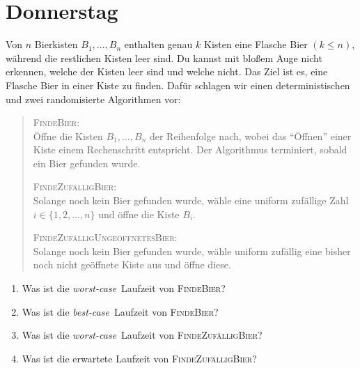 \documentclass{uebung_cs}
\begin{document}
\section*{Donnerstag}

\begin{exercise}[Bierkisten][\href{https://moodle.studiumdigitale.uni-frankfurt.de/moodle/mod/assign/view.php?id=239340}{moodle}\athome]
	Von $n$ Bierkisten $B_1,\dots,B_n$ enthalten genau $k$ Kisten eine Flasche Bier $(k \leq n)$, während die restlichen Kisten leer sind. Du kannst mit bloßem Auge nicht erkennen, welche der Kisten leer sind und welche nicht. Das Ziel ist es, eine Flasche Bier in einer Kiste zu finden. Dafür schlagen wir einen deterministischen und zwei randomisierte Algorithmen vor:
	\begin{quote}
		\textsc{FindeBier}:\\
		Öffne die Kisten $B_1,\dots,B_n$ der Reihenfolge nach, wobei das \enquote{Öffnen} einer Kiste einem Rechenschritt entspricht.
		Der Algorithmus terminiert, sobald ein Bier gefunden wurde.

		\textsc{FindeZufälligBier}:\\
		Solange noch kein Bier gefunden wurde, wähle eine uniform zufällige Zahl $i \in \{1,2,\dots,n\}$ und öffne die Kiste $B_i$.

		\textsc{FindeZufälligUngeöffnetesBier}:\\
		Solange noch kein Bier gefunden wurde, wähle uniform zufällig eine bisher noch nicht geöffnete Kiste aus und öffne diese.	
	\end{quote}
	
	\begin{enumerate}
		\item\easy Was ist die \textit{worst-case}~Laufzeit von \textsc{FindeBier}?
		\item\easy Was ist die \textit{best-case}~Laufzeit von \textsc{FindeBier}?
	\end{enumerate}
		
	\begin{enumerate}
		\setcounter{enumi}{2}
		\item\easy Was ist die \textit{worst-case}~Laufzeit von \textsc{FindeZufälligBier}?
		\item\medium Was ist die erwartete Laufzeit von \textsc{FindeZufälligBier}?
	\end{enumerate}	
	

\end{exercise}
\end{document}
